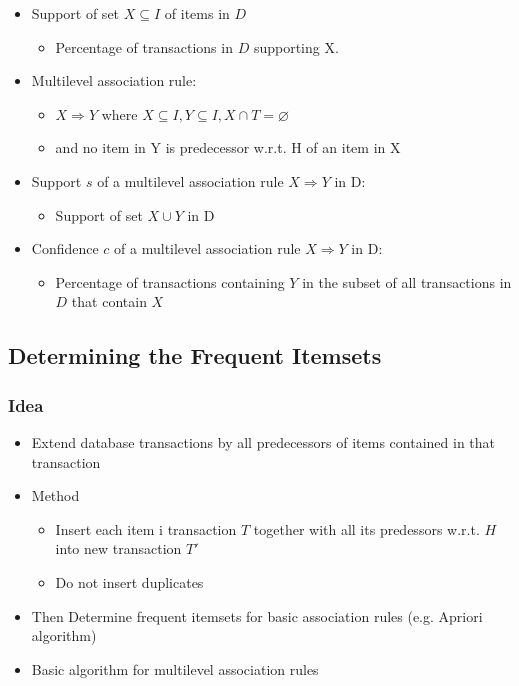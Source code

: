 \documentclass{article}
\begin{document}
\begin{itemize}
  \item Support of set $X \subseteq I$ of items in $D$
  \begin{itemize}
    \item Percentage of transactions in $D$ supporting X.
  \end{itemize}

  \item Multilevel association rule:
  \begin{itemize}
    \item $X \Rightarrow Y$ where $X \subseteq I, Y \subseteq I, X \cap T = \varnothing$
    \item and no item in Y is predecessor w.r.t. H of an item in X
  \end{itemize}

  \item Support $s$ of a multilevel association rule $X \Rightarrow Y$ in D:
  \begin{itemize}
    \item Support of set $X \cup Y$ in D
  \end{itemize}

  \item Confidence $c$ of a multilevel association rule $X \Rightarrow Y$ in D:
  \begin{itemize}
    \item Percentage of transactions containing $Y$ in the subset of all transactions in $D$ that contain $X$
  \end{itemize}
\end{itemize}

\newpage

\subsection{Determining the Frequent Itemsets}
\subsubsection{Idea}
\begin{itemize}
  \item Extend database transactions by all predecessors of items contained in that transaction

  \item Method
  \begin{itemize}
    \item Insert each item i transaction $T$ together with all its predessors w.r.t. $H$ into new transaction $T'$ 
    \item Do not insert duplicates
  \end{itemize}
 
  \item Then Determine frequent itemsets for basic association rules (e.g. Apriori algorithm)

  \item Basic algorithm for multilevel association rules
\end{itemize}
\end{document}
